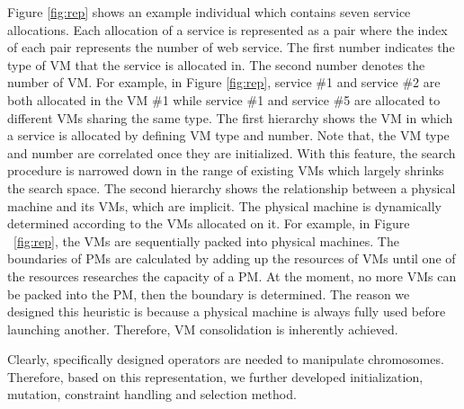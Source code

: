 Figure \ref{fig:rep} shows an example individual which contains seven service allocations. Each allocation of a service is represented as a pair where the index of each pair represents the number of web service. The first number indicates the type of VM that the service is allocated in. The second number denotes the number of VM.  For example, in Figure \ref{fig:rep}, service \#1 and service \#2 are both allocated in the VM \#1 while service \#1 and service \#5 are allocated to different VMs sharing the same type.
The first hierarchy shows the VM in which a service is allocated by defining VM type and number. 
Note that, the VM type and number are correlated once they are initialized. 
With this feature, the search procedure is narrowed down in the range of existing VMs which largely shrinks the search space.
The second hierarchy shows the relationship between a physical machine and its VMs, which are implicit. The physical machine is dynamically determined according to the VMs allocated on it. 
For example, in Figure ~\ref{fig:rep}, the VMs are 
sequentially packed into physical machines. The boundaries of PMs are calculated by adding up the resources of VMs until one of the resources researches the capacity of a PM. At the moment, no more VMs can be packed into the PM, then the boundary is determined.
The reason we designed this heuristic is because a physical machine is always fully used before launching another. Therefore, VM consolidation is inherently achieved.

Clearly, specifically designed operators are needed to manipulate chromosomes. Therefore, based on this representation, we further developed initialization, mutation, constraint handling and selection method.

